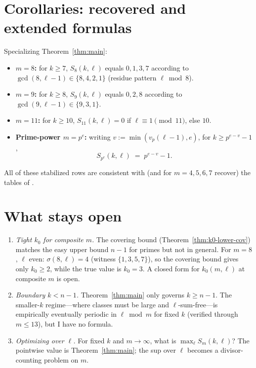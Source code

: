 \documentclass[11pt]{amsart}
\theoremstyle{plain}
\theoremstyle{definition}
\begin{document}
\section{Corollaries: recovered and extended formulas}\label{sec:corollaries}

Specializing Theorem~\ref{thm:main}:

\begin{itemize}[leftmargin=2em]
  \item \textbf{$m = 8$:} for $k\ge 7$, $S_8(k,\ell)$ equals $0,1,3,7$ according to $\gcd(8,\ell-1)\in\{8,4,2,1\}$ (residue pattern $\ell\bmod 8$).
  \item \textbf{$m = 9$:} for $k\ge 8$, $S_9(k,\ell)$ equals $0,2,8$ according to $\gcd(9,\ell-1)\in\{9,3,1\}$.
  \item \textbf{$m = 11$:} for $k\ge 10$, $S_{11}(k,\ell) = 0$ if $\ell\equiv 1\pmod{11}$, else $10$.
  \item \textbf{Prime-power $m=p^e$:} writing $v:=\min(v_p(\ell-1),e)$, for $k\ge p^{e-v}-1$,
  \[
  S_{p^e}(k,\ell) \;=\; p^{e-v} - 1.
  \]
\end{itemize}
All of these stabilized rows are consistent with (and for $m=4,5,6,7$ recover) the tables of \cite[\S 2--3]{DSWH2025}.

\section{What stays open}\label{sec:open}

\begin{enumerate}[leftmargin=2em,label=(\arabic*)]
  \item \emph{Tight $k_0$ for composite $m$.} The covering bound (Theorem~\ref{thm:k0-lower-cov}) matches the easy upper bound $n-1$ for primes but not in general. For $m=8$, $\ell$ even: $\sigma(8,\ell)=4$ (witness $\{1,3,5,7\}$), so the covering bound gives only $k_0\ge 2$, while the true value is $k_0=3$. A closed form for $k_0(m,\ell)$ at composite $m$ is open.
  \item \emph{Boundary $k < n-1$.} Theorem~\ref{thm:main} only governs $k\ge n-1$. The smaller-$k$ regime---where classes must be large and $\ell$-sum-free---is empirically eventually periodic in $\ell\bmod m$ for fixed $k$ (verified through $m\le 13$), but I have no formula.
  \item \emph{Optimizing over $\ell$.} For fixed $k$ and $m\to\infty$, what is $\max_\ell S_m(k,\ell)$? The pointwise value is Theorem~\ref{thm:main}; the sup over $\ell$ becomes a divisor-counting problem on $m$.
\end{enumerate}
\end{document}
